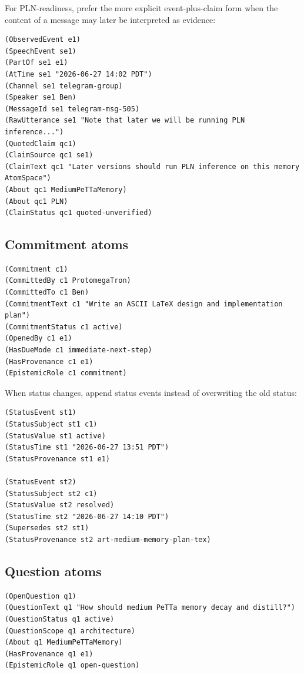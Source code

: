 \documentclass[11pt]{article}
\begin{document}
For PLN-readiness, prefer the more explicit event-plus-claim form when the content
of a message may later be interpreted as evidence:

\begin{verbatim}
(ObservedEvent e1)
(SpeechEvent se1)
(PartOf se1 e1)
(AtTime se1 "2026-06-27 14:02 PDT")
(Channel se1 telegram-group)
(Speaker se1 Ben)
(MessageId se1 telegram-msg-505)
(RawUtterance se1 "Note that later we will be running PLN inference...")
(QuotedClaim qc1)
(ClaimSource qc1 se1)
(ClaimText qc1 "Later versions should run PLN inference on this memory AtomSpace")
(About qc1 MediumPeTTaMemory)
(About qc1 PLN)
(ClaimStatus qc1 quoted-unverified)
\end{verbatim}

\subsection{Commitment atoms}

\begin{verbatim}
(Commitment c1)
(CommittedBy c1 ProtomegaTron)
(CommittedTo c1 Ben)
(CommitmentText c1 "Write an ASCII LaTeX design and implementation plan")
(CommitmentStatus c1 active)
(OpenedBy c1 e1)
(HasDueMode c1 immediate-next-step)
(HasProvenance c1 e1)
(EpistemicRole c1 commitment)
\end{verbatim}

When status changes, append status events instead of overwriting the old status:

\begin{verbatim}
(StatusEvent st1)
(StatusSubject st1 c1)
(StatusValue st1 active)
(StatusTime st1 "2026-06-27 13:51 PDT")
(StatusProvenance st1 e1)

(StatusEvent st2)
(StatusSubject st2 c1)
(StatusValue st2 resolved)
(StatusTime st2 "2026-06-27 14:10 PDT")
(Supersedes st2 st1)
(StatusProvenance st2 art-medium-memory-plan-tex)
\end{verbatim}

\subsection{Question atoms}

\begin{verbatim}
(OpenQuestion q1)
(QuestionText q1 "How should medium PeTTa memory decay and distill?")
(QuestionStatus q1 active)
(QuestionScope q1 architecture)
(About q1 MediumPeTTaMemory)
(HasProvenance q1 e1)
(EpistemicRole q1 open-question)
\end{verbatim}
\end{document}
